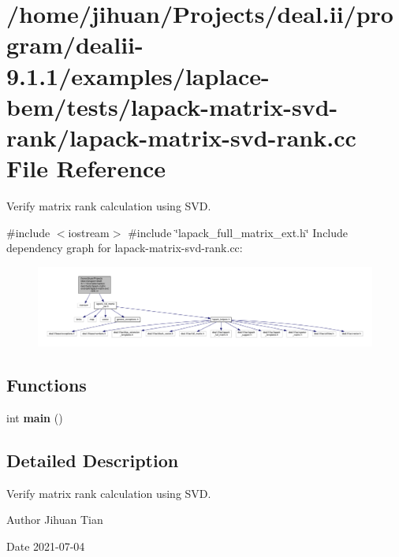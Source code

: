 \hypertarget{lapack-matrix-svd-rank_8cc}{}\section{/home/jihuan/\+Projects/deal.ii/program/dealii-\/9.1.1/examples/laplace-\/bem/tests/lapack-\/matrix-\/svd-\/rank/lapack-\/matrix-\/svd-\/rank.cc File Reference}
\label{lapack-matrix-svd-rank_8cc}


Verify matrix rank calculation using S\+VD.  


{\ttfamily \#include $<$iostream$>$}\newline
{\ttfamily \#include \char`\"{}lapack\+\_\+full\+\_\+matrix\+\_\+ext.\+h\char`\"{}}\newline
Include dependency graph for lapack-\/matrix-\/svd-\/rank.cc\+:\nopagebreak
\begin{figure}[H]
\begin{center}
\leavevmode
\includegraphics[width=350pt]{lapack-matrix-svd-rank_8cc__incl}
\end{center}
\end{figure}
\subsection*{Functions}
\begin{DoxyCompactItemize}
\item 
\mbox{\label{lapack-matrix-svd-rank_8cc_ae66f6b31b5ad750f1fe042a706a4e3d4}} 
int {\bfseries main} ()
\end{DoxyCompactItemize}


\subsection{Detailed Description}
Verify matrix rank calculation using S\+VD. 

\begin{DoxyAuthor}{Author}
Jihuan Tian 
\end{DoxyAuthor}
\begin{DoxyDate}{Date}
2021-\/07-\/04 
\end{DoxyDate}

